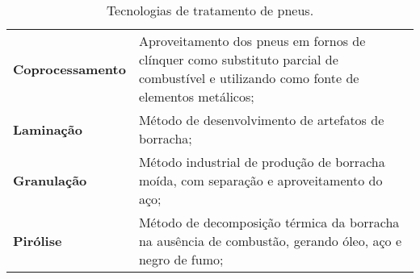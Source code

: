 \begin{table}[htbp]
  \centering
  \caption{Tecnologias de tratamento de pneus.}
    \begin{tabular}{P{8.543em}|P{28.855em}}
     \textbf{Coprocessamento} & Aproveitamento dos pneus em fornos de clínquer como substituto parcial de combustível e utilizando como fonte de elementos metálicos; \\
     \textbf{Laminação} & Método de desenvolvimento de artefatos de borracha; \\
     \textbf{Granulação} & Método industrial de produção de borracha moída, com separação e aproveitamento do aço; \\
     \textbf{Pirólise} & Método de decomposição térmica da borracha na ausência de combustão, gerando óleo, aço e negro de fumo; \\
\end{tabular}%
  \label{tab:tratamento_pneus}%
\end{table}%
